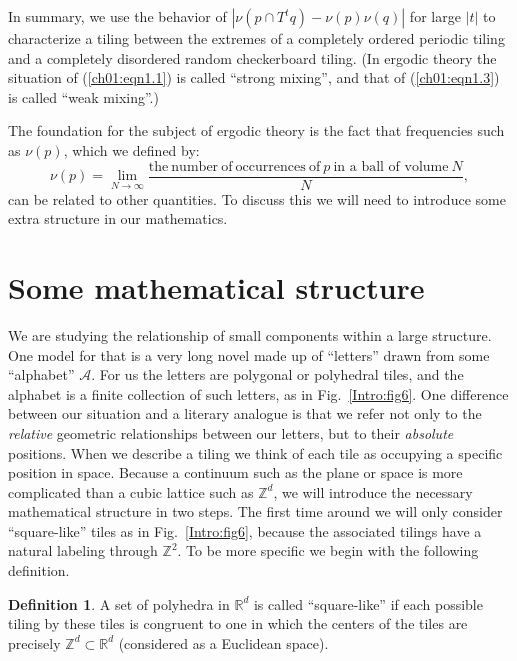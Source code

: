 \documentclass[reqno]{stml-l}
\theoremstyle{plain}
\theoremstyle{definition}
\newtheorem{definition}[theorem]{Definition}
\numberwithin{equation}{chapter}
\begin{document}
In summary, we use the behavior of $|\nu(p\cap
T^{t}q)-\nu(p)\nu(q)|$ for large $|t|$ to characterize a
tiling between the extremes of a completely ordered
periodic tiling and a completely disordered random
checkerboard tiling. (In ergodic theory the situation of
(\ref{ch01:eqn1.1}) is called ``strong mixing'', and that
of (\ref{ch01:eqn1.3}) is called ``weak mixing''.)

The foundation for the subject of ergodic theory is the fact that frequencies such as $\nu(p)$, which we defined by:
\begin{equation}
\nu(p)=\lim\limits_{N\rightarrow\infty}\frac{\mathrm{the\ number\ of\ occurrences\
of}\ p\ \text{in a ball of volume}\ N} {N}, \label{ch01:eqn1.4}
\end{equation}
can be related to other quantities. To discuss this we will
need to introduce some extra structure in our mathematics.

\section{Some mathematical structure}\label{ch01:sec2}

We are studying the relationship of small components within
a large structure. One model for that is a very long novel
made up of ``letters'' drawn from some ``alphabet''
$\mathcal{A}$. For us the letters are polygonal or
polyhedral tiles, and the alphabet is a finite collection
of such letters, as in Fig.~\ref{Intro:fig6}. One
difference between our situation and a literary analogue is
that we refer not only to the \emph{relative} geometric
relationships between our letters, but to their
\emph{absolute} positions. When we describe a tiling we
think of each tile as occupying a specific position in
space. Because a continuum such as the plane or space is
more complicated than a cubic lattice such as
$\mathbb{Z}^{d}$, we will introduce the necessary
mathematical structure in two steps. The first time around
we will only consider
``square-like'' tiles as in
Fig.~\ref{Intro:fig6}, because the associated tilings have
a natural labeling through $\mathbb{Z}^{2}$. To be more
specific we begin with the following definition.

\begin{definition}\label{ch01:def1.1}
A set of polyhedra in $\mathbb{R}^{d}$ is called
``square-like'' if each possible tiling by these tiles is
congruent to one in which the centers of the tiles are
precisely $\mathbb{Z}^{d}\subset \mathbb{R}^{d}$
(considered as a Euclidean space).
\end{definition}
\end{document}
